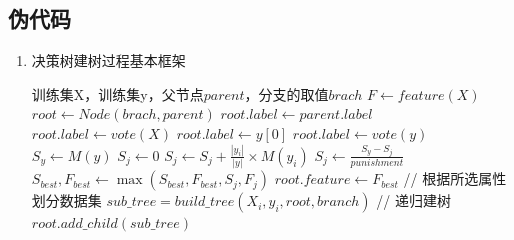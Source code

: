 \documentclass[UTF8,a4paper,12pt]{article}
\begin{document}
\subsection{伪代码}
\begin{enumerate}[itemindent=0.5em,label=\arabic*、]
  \item 决策树建树过程基本框架
  \begin{algorithm}
        \begin{algorithmic}[1] %
            \Require 训练集X，训练集y，父节点$parent$，分支的取值$brach$
                \State $F \gets feature(X)$
                \State $root \gets Node(brach, parent)$
                  \State $root.label \gets parent.label$
                  \State $root.label \gets vote(X)$
                  \State $root.label \gets y[0]$
                \Else
                \State $root.label \gets vote(y)$
                \State $S_y \gets M(y)$
                  \State $S_j \gets 0$
                    \State $S_j \gets S_j + \frac{|y_i|}{|y|} \times M(y_i)$
                  \EndFor
                  \State $S_j \gets \frac{S_y - S_j}{punishment}$
                  \State $S_{best}, F_{best} \gets \max(S_{best}, F_{best}, S_j, F_j)$
                \EndFor
                \State $root.feature \gets F_{best}$
                \State // 根据所选属性划分数据集
                  \State $sub\_tree = build\_tree(X_i, y_i, root, branch)$ // 递归建树
                  \State $root.add\_child(sub\_tree)$
                \EndFor
                \EndIf
                \State {}
            \EndFunction
        \end{algorithmic}
    \end{algorithm}
\end{enumerate}

\newpage
\end{document}
